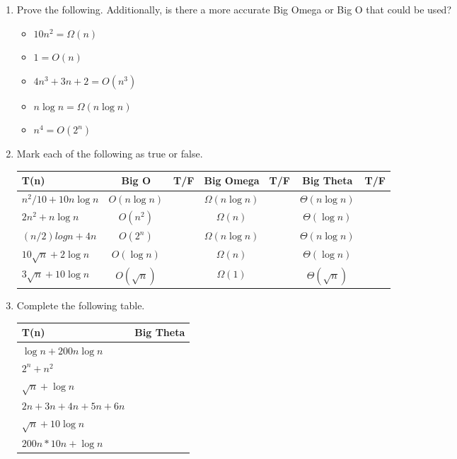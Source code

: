 \documentclass[11pt]{article}
\begin{document}
\begin{enumerate}[leftmargin=*]

\item Prove the following. Additionally, is there a more accurate Big Omega or Big O that could be used?
\begin{itemize}
    \item $10n^2 = \Omega(n)$
    \item $1 = O(n)$
    \item $4n^3+3n+2 = O(n^3)$
    \item $n \log n = \Omega(n \log n)$
    \item $n^4 = O(2^n)$
\end{itemize}

\item Mark each of the following as true or false.
    \begin{center}
        \begin{tabular}{l | c | c | c | c | c | c}
            T(n) & Big O & T/F & Big Omega & T/F & Big Theta & T/F \\ \hline
            $ n^2/10 + 10 n \log n$ & $O(n \log n)$ & & $\Omega(n \log n)$ & & $\Theta(n \log n)$ & \\ \hline
            $ 2n^2 + n \log n$ & $O(n^2)$ & & $\Omega(n)$ & & $\Theta(\log n)$ & \\ \hline
            $(n/2) log n + 4n$ & $O(2^n)$ & & $\Omega(n \log n)$ & & $\Theta(n \log n)$ & \\ \hline
            $10 \sqrt{n} + 2\log n$ & $O(\log n)$ & & $\Omega(n)$ & & $\Theta(\log n)$ & \\ \hline
            $3\sqrt{n} + 10 \log n$ & $O(\sqrt n)$ & & $\Omega(1)$ & & $\Theta(\sqrt n)$ & \\ \hline
        \end{tabular}
    \end{center}
    \item Complete the following table.
    \begin{center}
        \begin{tabular}{l | c }
            T(n) & Big Theta \\ \hline
            $\log n + 200 n \log n$ & \\ \hline
            $2^n + n^2$ & \\ \hline
            $\sqrt n + \log n$ & \\ \hline
            $2n + 3n + 4n + 5n + 6n$ & \\ \hline
            $\sqrt{n} + 10 \log n$ & \\ \hline
            $200 n * 10 n + \log n$ & \\ \hline
        \end{tabular}
    \end{center}
    

\end{enumerate}
\end{document}
